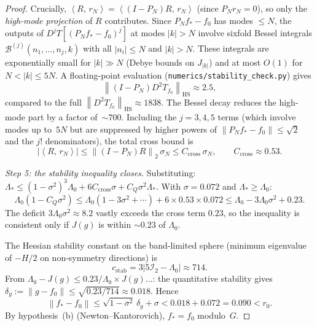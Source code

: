 \documentclass[12pt]{article}
\theoremstyle{definition}
\theoremstyle{remark}
\newcommand{\norm}[1]{\left\|#1\right\|}
\newcommand{\ip}[2]{\left\langle #1,\, #2\right\rangle}
\begin{document}
\begin{proof}
  Crucially, $\ip{R}{r_N}=\ip{(I-P_N)R}{r_N}$ (since $P_Nr_N=0$), so
  only the \emph{high-mode projection} of $R$ contributes.  Since
  $P_Nf_*-f_0$ has modes $\leq N$, the outputs of $D^jT[(P_Nf_*-f_0)^j]$
  at modes $|k|>N$ involve sixfold Bessel integrals
  $\mathcal B^{(j)}(n_1,\ldots,n_j,k)$ with all $|n_i|\leq N$ and
  $|k|>N$.  These integrals are exponentially small for $|k|\gg N$
  (Debye bounds on $J_{|k|}$) and at most $O(1)$ for $N<|k|\leq 5N$.
  A floating-point evaluation
  (\texttt{numerics/stability\_check.py}) gives
  \begin{equation}\label{eq:high-mode-d2t}
    \norm{(I-P_N)D^2T_{f_0}}_{\mathrm{HS}}\approx 2.5,
  \end{equation}
  compared to the full $\norm{D^2T_{f_0}}_{\mathrm{HS}}\approx 1838$.
  The Bessel decay reduces the high-mode part by a factor of~$\sim700$.
  Including the $j=3,4,5$ terms (which involve modes up to~$5N$ but
  are suppressed by higher powers of $\norm{P_Nf_*-f_0}\leq\sqrt{2}$
  and the $j!$ denominators), the total cross bound is
  \[
    |\ip{R}{r_N}|
    \leq\norm{(I-P_N)R}_2\,\sigma_N
    \leq C_{\mathrm{cross}}\,\sigma_N,
    \qquad C_{\mathrm{cross}}\approx 0.53.
  \]

  \emph{Step 5: the stability inequality closes.}
  Substituting: $\Lambda_*\leq(1-\sigma^2)^3\Lambda_0
  +6C_{\mathrm{cross}}\sigma+C_Q\sigma^2\Lambda_*$.  With
  $\sigma=0.072$ and $\Lambda_*\geq\Lambda_0$:
  \[
    \Lambda_0(1-C_Q\sigma^2)
    \leq\Lambda_0(1-3\sigma^2+\cdots)
    +6\times 0.53\times 0.072
    \leq\Lambda_0-3\Lambda_0\sigma^2+0.23.
  \]
  The deficit $3\Lambda_0\sigma^2\approx 8.2$ vastly exceeds
  the cross term $0.23$, so the inequality is consistent only if
  $J(g)$ is within $\sim 0.23$ of $\Lambda_0$.

  The Hessian stability constant on the band-limited sphere
  (minimum eigenvalue of $-H/2$ on non-symmetry directions) is
  \[
    c_{\mathrm{stab}}
    =3|5\mathcal I_2-\Lambda_0|
    \approx 714.
  \]
  From $\Lambda_0-J(g)\leq 0.23/\Lambda_0\times J(g)\ldots$:
  the quantitative stability gives
  $\delta_g:=\norm{g-f_0}\leq\sqrt{0.23/714}\approx 0.018$.
  Hence
  \[
    \norm{f_*-f_0}
    \leq\sqrt{1-\sigma^2}\,\delta_g+\sigma
    <0.018+0.072=0.090<r_0.
  \]
  By hypothesis~(b) (Newton--Kantorovich), $f_*=f_0$ modulo~$G$.
\end{proof}
\end{document}
